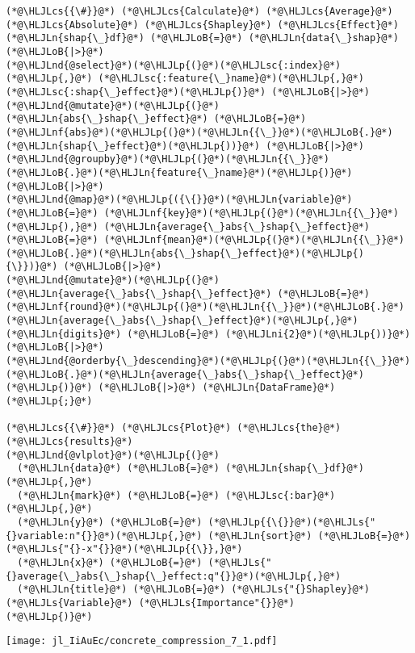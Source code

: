 \documentclass[12pt,a4paper]{article}
\newcommand{\HLJLn}[1]{#1}
\newcommand{\HLJLnd}[1]{\textcolor[RGB]{214,102,97}{#1}}
\newcommand{\HLJLnf}[1]{\textcolor[RGB]{66,102,213}{#1}}
\newcommand{\HLJLs}[1]{\textcolor[RGB]{201,61,57}{#1}}
\newcommand{\HLJLsc}[1]{\textcolor[RGB]{201,61,57}{#1}}
\newcommand{\HLJLni}[1]{\textcolor[RGB]{59,151,46}{#1}}
\newcommand{\HLJLoB}[1]{\textcolor[RGB]{102,102,102}{\textbf{#1}}}
\newcommand{\HLJLp}[1]{#1}
\newcommand{\HLJLcs}[1]{\textcolor[RGB]{153,153,119}{\textit{#1}}}
\begin{document}
\begin{lstlisting}
(*@\HLJLcs{{\#}}@*) (*@\HLJLcs{Calculate}@*) (*@\HLJLcs{Average}@*) (*@\HLJLcs{Absolute}@*) (*@\HLJLcs{Shapley}@*) (*@\HLJLcs{Effect}@*)
(*@\HLJLn{shap{\_}df}@*) (*@\HLJLoB{=}@*) (*@\HLJLn{data{\_}shap}@*) (*@\HLJLoB{|>}@*) 
(*@\HLJLnd{@select}@*)(*@\HLJLp{(}@*)(*@\HLJLsc{:index}@*)(*@\HLJLp{,}@*) (*@\HLJLsc{:feature{\_}name}@*)(*@\HLJLp{,}@*) (*@\HLJLsc{:shap{\_}effect}@*)(*@\HLJLp{)}@*) (*@\HLJLoB{|>}@*)
(*@\HLJLnd{@mutate}@*)(*@\HLJLp{(}@*)(*@\HLJLn{abs{\_}shap{\_}effect}@*) (*@\HLJLoB{=}@*) (*@\HLJLnf{abs}@*)(*@\HLJLp{(}@*)(*@\HLJLn{{\_}}@*)(*@\HLJLoB{.}@*)(*@\HLJLn{shap{\_}effect}@*)(*@\HLJLp{))}@*) (*@\HLJLoB{|>}@*)
(*@\HLJLnd{@groupby}@*)(*@\HLJLp{(}@*)(*@\HLJLn{{\_}}@*)(*@\HLJLoB{.}@*)(*@\HLJLn{feature{\_}name}@*)(*@\HLJLp{)}@*) (*@\HLJLoB{|>}@*)
(*@\HLJLnd{@map}@*)(*@\HLJLp{({\{}}@*)(*@\HLJLn{variable}@*) (*@\HLJLoB{=}@*) (*@\HLJLnf{key}@*)(*@\HLJLp{(}@*)(*@\HLJLn{{\_}}@*)(*@\HLJLp{),}@*) (*@\HLJLn{average{\_}abs{\_}shap{\_}effect}@*) (*@\HLJLoB{=}@*) (*@\HLJLnf{mean}@*)(*@\HLJLp{(}@*)(*@\HLJLn{{\_}}@*)(*@\HLJLoB{.}@*)(*@\HLJLn{abs{\_}shap{\_}effect}@*)(*@\HLJLp{){\}})}@*) (*@\HLJLoB{|>}@*)
(*@\HLJLnd{@mutate}@*)(*@\HLJLp{(}@*)(*@\HLJLn{average{\_}abs{\_}shap{\_}effect}@*) (*@\HLJLoB{=}@*) (*@\HLJLnf{round}@*)(*@\HLJLp{(}@*)(*@\HLJLn{{\_}}@*)(*@\HLJLoB{.}@*)(*@\HLJLn{average{\_}abs{\_}shap{\_}effect}@*)(*@\HLJLp{,}@*) (*@\HLJLn{digits}@*) (*@\HLJLoB{=}@*) (*@\HLJLni{2}@*)(*@\HLJLp{))}@*) (*@\HLJLoB{|>}@*)
(*@\HLJLnd{@orderby{\_}descending}@*)(*@\HLJLp{(}@*)(*@\HLJLn{{\_}}@*)(*@\HLJLoB{.}@*)(*@\HLJLn{average{\_}abs{\_}shap{\_}effect}@*)(*@\HLJLp{)}@*) (*@\HLJLoB{|>}@*) (*@\HLJLn{DataFrame}@*)(*@\HLJLp{;}@*)

(*@\HLJLcs{{\#}}@*) (*@\HLJLcs{Plot}@*) (*@\HLJLcs{the}@*) (*@\HLJLcs{results}@*)
(*@\HLJLnd{@vlplot}@*)(*@\HLJLp{(}@*)
  (*@\HLJLn{data}@*) (*@\HLJLoB{=}@*) (*@\HLJLn{shap{\_}df}@*)(*@\HLJLp{,}@*)
  (*@\HLJLn{mark}@*) (*@\HLJLoB{=}@*) (*@\HLJLsc{:bar}@*)(*@\HLJLp{,}@*)
  (*@\HLJLn{y}@*) (*@\HLJLoB{=}@*) (*@\HLJLp{{\{}}@*)(*@\HLJLs{"{}variable:n"{}}@*)(*@\HLJLp{,}@*) (*@\HLJLn{sort}@*) (*@\HLJLoB{=}@*) (*@\HLJLs{"{}-x"{}}@*)(*@\HLJLp{{\}},}@*)
  (*@\HLJLn{x}@*) (*@\HLJLoB{=}@*) (*@\HLJLs{"{}average{\_}abs{\_}shap{\_}effect:q"{}}@*)(*@\HLJLp{,}@*)
  (*@\HLJLn{title}@*) (*@\HLJLoB{=}@*) (*@\HLJLs{"{}Shapley}@*) (*@\HLJLs{Variable}@*) (*@\HLJLs{Importance"{}}@*)
(*@\HLJLp{)}@*)
\end{lstlisting}

\texttt{[image: jl\_IiAuEc/concrete\_compression\_7\_1.pdf]}
\end{document}
